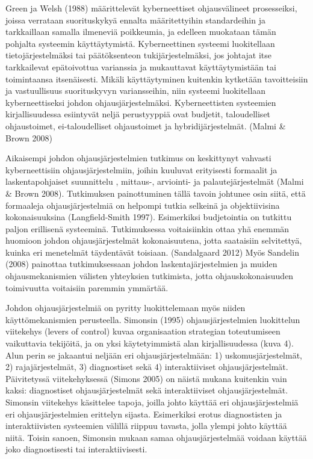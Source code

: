 \documentclass[12pt,a4paper,oneside,pdftex]{report}
\begin{document}
Green ja Welsh (1988) määrittelevät kyberneettiset ohjausvälineet prosesseiksi, joissa verrataan suorituskykyä ennalta määritettyihin standardeihin ja tarkkaillaan samalla ilmeneviä poikkeumia, ja edelleen muokataan tämän pohjalta systeemin käyttäytymistä. Kyberneettinen systeemi luokitellaan tietojärjestelmäksi tai päätöksenteon tukijärjestelmäksi, jos johtajat itse tarkkailevat epätoivottua varianssia ja mukauttavat käyttäytymistään tai toimintaansa itsenäisesti. Mikäli käyttäytyminen kuitenkin kytketään tavoitteisiin ja vastuullisuus suorituskyvyn variansseihin, niin systeemi luokitellaan kyberneettiseksi johdon ohjausjärjestelmäksi. Kyberneettisten systeemien kirjallisuudessa esiintyvät neljä perustyyppiä ovat budjetit, taloudelliset ohjaustoimet, ei-taloudelliset ohjaustoimet ja hybridijärjestelmät. (Malmi & Brown 2008)

Aikaisempi johdon ohjausjärjestelmien tutkimus on keskittynyt vahvasti kyberneettisiin ohjausjärjestelmiin, joihin kuuluvat erityisesti formaalit ja laskentapohjaiset suunnittelu ,  mittaus-, arviointi- ja palautejärjestelmät (Malmi & Brown 2008). Tutkimuksen painottuminen tällä tavoin johtunee osin siitä, että formaaleja ohjausjärjestelmiä on helpompi tutkia selkeinä ja objektiivisina kokonaisuuksina (Langfield-Smith 1997). Esimerkiksi budjetointia on tutkittu paljon erillisenä systeeminä. Tutkimuksessa voitaisiinkin ottaa yhä enemmän huomioon johdon ohjausjärjestelmät kokonaisuutena, jotta saataisiin selvitettyä, kuinka eri menetelmät täydentävät toisiaan. (Sandalgaard 2012) Myös Sandelin (2008) painottaa tutkimuksessaan johdon laskentajärjestelmien ja muiden ohjausmekanismien välisten yhteyksien tutkimista, jotta ohjauskokonaisuuden toimivuutta voitaisiin paremmin ymmärtää. 

Johdon ohjausjärjestelmiä on pyritty luokittelemaan myös niiden käyttömekanismien perusteella. Simonsin (1995) ohjausjärjestelmien luokittelun viitekehys (levers of control) kuvaa organisaation strategian toteutumiseen vaikuttavia tekijöitä, ja on yksi käytetyimmistä alan kirjallisuudessa (kuva 4). Alun perin se jakaantui neljään eri ohjausjärjestelmään: 1) uskomusjärjestelmät, 2) rajajärjestelmät, 3) diagnostiset sekä 4) interaktiiviset ohjausjärjestelmät. Päivitetyssä viitekehyksessä (Simons 2005) on näistä mukana kuitenkin vain kaksi: diagnostiset ohjausjärjestelmät sekä interaktiiviset ohjausjärjestelmät. Simonsin viitekehys käsittelee tapoja, joilla johto käyttää eri ohjausjärjestelmiä eri ohjausjärjestelmien erittelyn sijasta. Esimerkiksi erotus diagnostisten ja interaktiivisten systeemien välillä riippuu tavasta, jolla ylempi johto käyttää niitä. Toisin sanoen, Simonsin mukaan samaa ohjausjärjestelmää voidaan käyttää joko diagnostisesti tai interaktiivisesti.
\end{document}
